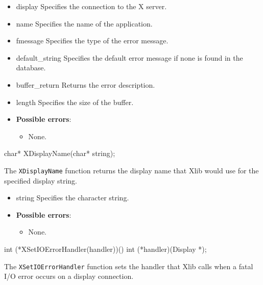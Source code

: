 \documentclass{report}
\begin{document}
\begin{itemize}
        \begin{itemize}
            \item display Specifies the connection to the X server.
            \item name Specifies the name of the application.
            \item fmessage Specifies the type of the error message.
            \item default\_string Specifies the default error message if none is found in the database.
            \item buffer\_return Returns the error description.
            \item length Specifies the size of the buffer.
        \end{itemize}

        \begin{itemize}
            \item \textbf{Possible errors}:
            \begin{itemize}
                \item None.
            \end{itemize}
        \end{itemize}

        \begin{cppcode}
            char* XDisplayName(char* string);
        \end{cppcode}
        \bigbreak \noindent
        The \texttt{XDisplayName} function returns the display name that Xlib would use for the specified display string.

        \begin{itemize}
            \item string Specifies the character string.
        \end{itemize}

        \begin{itemize}
            \item \textbf{Possible errors}:
            \begin{itemize}
                \item None.
            \end{itemize}
        \end{itemize}

        \begin{cppcode}
            int (*XSetIOErrorHandler(handler))()
                int (*handler)(Display *);
        \end{cppcode}
        \bigbreak \noindent
        The \texttt{XSetIOErrorHandler} function sets the handler that Xlib calls when a fatal I/O error occurs on a display connection.


\end{itemize}
\end{document}
